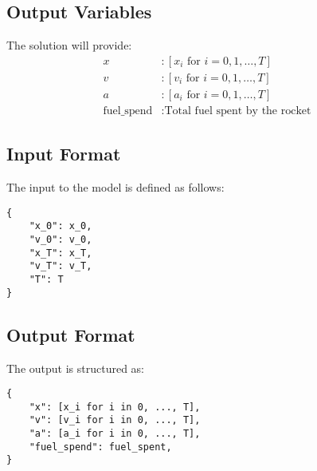 \documentclass{article}
\begin{document}
\subsection*{Output Variables}
The solution will provide:
\begin{align*}
x & : [x_i \text{ for } i = 0, 1, \ldots, T] \\
v & : [v_i \text{ for } i = 0, 1, \ldots, T] \\
a & : [a_i \text{ for } i = 0, 1, \ldots, T] \\
\text{fuel\_spend} & : \text{Total fuel spent by the rocket}
\end{align*}

\subsection*{Input Format}
The input to the model is defined as follows:
\begin{verbatim}
{
    "x_0": x_0,
    "v_0": v_0,
    "x_T": x_T,
    "v_T": v_T,
    "T": T
}
\end{verbatim}

\subsection*{Output Format}
The output is structured as:
\begin{verbatim}
{
    "x": [x_i for i in 0, ..., T],
    "v": [v_i for i in 0, ..., T],
    "a": [a_i for i in 0, ..., T],
    "fuel_spend": fuel_spent,
}
\end{verbatim}
\end{document}
